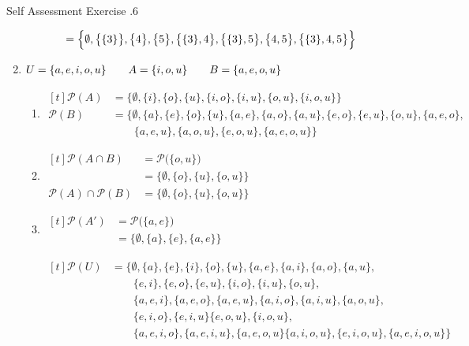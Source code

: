 \documentclass[\main/notes.tex]{subfiles}
\begin{document}
\begin{exercise}{Self Assessment Exercise \thechapter.6}
\begin{enumerate}
\begin{align*}
							&= \Bigl\{\emptyset, \bigl\{\{3\}\bigr\}, \bigl\{4\bigr\}, \bigl\{5\bigr\}, \bigl\{\{3\}, 4\bigr\}, \bigl\{\{3\}, 5\bigr\}, \bigl\{4, 5\bigr\}, \bigl\{\{3\}, 4, 5\bigr\}\Bigr\}
						\end{align*}
					\pagebreak
					\item \hfill $
						\begin{alignedat}[t]{3}
							U &= \{a, e, i, o, u\} \qquad & A &= \{i, o, u\} \qquad & B &= \{a, e, o, u\}
						\end{alignedat} $ \hfill \phantom{4 \quad}
						\begin{enumerate}[label=(\alph*), labelsep=1em]
							\item $
								\begin{aligned}[t]
									\mathcal{P}(A) &= \bigl\{\emptyset, \{i\}, \{o\}, \{u\}, \{i, o\}, \{i, u\}, \{o, u\}, \{i, o, u\}\bigr\}\\
									\mathcal{P}(B) &= \bigl\{\emptyset, \{a\}, \{e\}, \{o\}, \{u\}, \{a, e\}, \{a, o\}, \{a, u\}, \{e, o\}, \{e, u\}, \{o, u\}, \{a, e, o\},\\
									& \qquad \{a, e, u\}, \{a, o, u\}, \{e, o, u\}, \{a, e, o, u\}\bigr\}
								\end{aligned} $
							\item $
								\begin{aligned}[t]
									\mathcal{P}(A \cap B) &= \mathcal{P}\bigl(\{o, u\}\bigr)\\
									&= \bigl\{\emptyset, \{o\}, \{u\}, \{o, u\}\bigr\}\\
									\mathcal{P}(A) \cap \mathcal{P}(B) &= \bigl\{\emptyset, \{o\}, \{u\}, \{o, u\}\bigr\}
								\end{aligned} $
							\item $
								\begin{aligned}[t]
									\mathcal{P}\left(A'\right) &= \mathcal{P}\bigl(\{a, e\}\bigr)\\
									&= \bigl\{\emptyset, \{a\}, \{e\}, \{a, e\}\bigr\}
								\end{aligned}$

								$\begin{aligned}[t]
									\mathcal{P}(U) &= \bigl\{\emptyset, \{a\}, \{e\}, \{i\}, \{o\}, \{u\}, \{a, e\}, \{a, i\}, \{a, o\}, \{a, u\},\\
									& \qquad \{e, i\}, \{e, o\}, \{e, u\}, \{i, o\}, \{i, u\}, \{o, u\},\\
									& \qquad \{a, e, i\}, \{a, e, o\}, \{a, e, u\}, \{a, i, o\}, \{a, i, u\}, \{a, o, u\},\\
									& \qquad \{e, i, o\}, \{e, i, u\} \{e, o, u\}, \{i, o, u\},\\
									& \qquad \{a, e, i, o\}, \{a, e, i, u\}, \{a, e, o, u\} \{a, i, o, u\}, \{e, i, o, u\}, \{a, e, i, o, u\}\bigr\}
								\end{aligned} $


\end{enumerate}
\end{enumerate}
\end{exercise}
\end{document}
